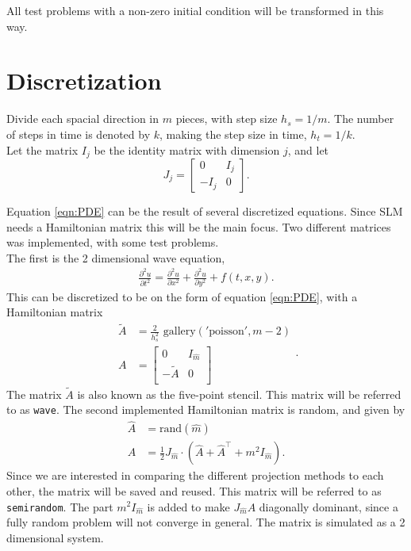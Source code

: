 All test problems with a non-zero initial condition will be transformed in this way.

\section{Discretization}%
Divide each spacial direction in $m$ pieces, with step size $h_s = 1/m$. The number of steps in time is denoted by $k$, making the step size in time, $h_t = 1/k$.\\

Let the matrix $I_j$ be the identity matrix with dimension $j$, and let 
\begin{equation}
J_j = 
\begin{bmatrix}
0&I_j\\-I_j&0
\end{bmatrix}.
\end{equation}

Equation \eqref{eqn:PDE} can be the result of several discretized equations. Since SLM needs a Hamiltonian matrix this will be the main focus. Two different matrices was implemented, with some test problems.\\

The first is the 2 dimensional wave equation, 
\begin{equation}
\begin{aligned}
\frac{\partial^2 u}{\partial t^2} = \frac{\partial^2 u}{\partial x^2}+ \frac{\partial^2 u}{\partial y^2} + f(t,x,y).
\end{aligned}
\label{eqn:wave}
\end{equation}
This can be discretized to be on the form of equation \eqref{eqn:PDE}, with a Hamiltonian matrix
\begin{equation}
\begin{aligned}
\tilde{A} &= \frac{2}{h_s^2} \text{ gallery}('\text{poisson}', m-2) \\
A &= 
\begin{bmatrix}
 0 & I_{\hat{m}} \\ - \tilde{A} & 0 \\
\end{bmatrix}
\end{aligned}.
\end{equation}
The matrix $\tilde{A}$ is also known as the five-point stencil\cite{fivepoint}. This matrix will be referred to as \texttt{wave}. The second implemented Hamiltonian matrix is random, and given by
\begin{equation}
\begin{aligned}
\hat{A} &= \text{rand}(\hat{m}) \\
A &= \frac{1}{2} J_{\hat{m}} \cdot (\hat{A} + \hat{A}^\top + m^2 I_{\hat{m}}).
\end{aligned}
\end{equation}
Since we are interested in comparing the different projection methods to each other, the matrix will be saved and reused. This matrix will be referred to as \texttt{semirandom}. The part $m^2 I_{\hat{m}} $ is added to make $J_{\hat{m}}A$ diagonally dominant, since a fully random problem will not converge in general. The matrix is simulated as a 2 dimensional system. 


